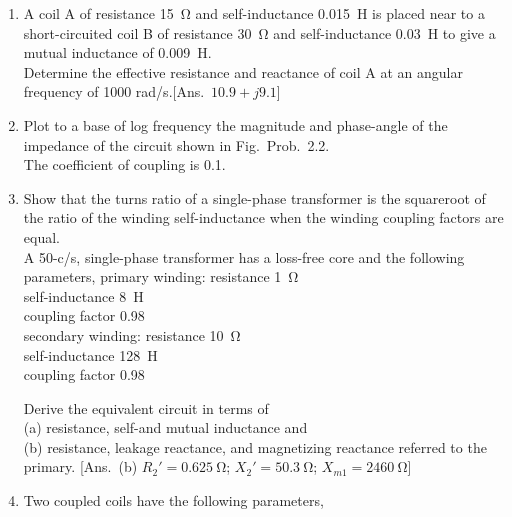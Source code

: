 \documentclass[a4paper,numbers=noenddot,12pt]{scrbook}
\begin{document}
                \begin{enumerate}[label={\thechapter.\arabic*},leftmargin=*]
                    \item A coil A of resistance \SI{15}{\ohm} and self-inductance \SI{0.015}{\henry} is placed near to a short-circuited coil B of resistance \SI{30}{\ohm} and self-inductance \SI{0.03}{\henry} to give a mutual inductance of \SI{0.009}{\henry}.\\ \indent 
                        Determine the effective resistance and reactance of coil A at an angular frequency of 1000 rad/s.[Ans.\ $10.9 + j9.1$]

                    \item Plot to a base of log frequency the magnitude and phase-angle of the impedance of the circuit shown in Fig.\ Prob.\ 2.2.\\ 
                        The coefficient of coupling is 0.1.

                    \item Show that the turns ratio of a single-phase transformer is the square­root of the ratio of the winding self-inductance when the winding coupling factors are equal.\\
                        A 50-c/s, single-phase transformer has a loss-free core and the following parameters,
                        primary winding: resistance \SI{1}{\ohm}\\
                        self-inductance \SI{8}{\henry}\\
                        coupling factor 0.98\\
                        secondary winding: 	resistance \SI{10}{\ohm}\\
                        self-inductance \SI{128}{\henry} \\
                        coupling factor 0.98

                        Derive the equivalent circuit in terms of \\
                        (a) resistance, self-and mutual inductance and \\
                        (b) resistance, leakage reactance, and magnetizing reactance referred to the primary. 
                        [Ans.\ (b) $R_2' = \SI{0.625}{\ohm}$; $X_2' = \SI{50.3}{\ohm}$; $X_{m1} = \SI{2460}{\ohm}$]

                    \item Two coupled coils have the following parameters, 


\end{enumerate}
\end{document}
